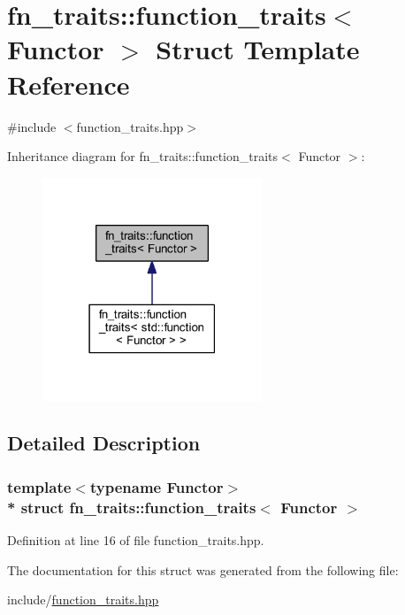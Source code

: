 \hypertarget{structfn__traits_1_1function__traits}{}\section{fn\+\_\+traits\+:\+:function\+\_\+traits$<$ Functor $>$ Struct Template Reference}
\label{structfn__traits_1_1function__traits}


{\ttfamily \#include $<$function\+\_\+traits.\+hpp$>$}



Inheritance diagram for fn\+\_\+traits\+:\+:function\+\_\+traits$<$ Functor $>$\+:\nopagebreak
\begin{figure}[H]
\begin{center}
\leavevmode
\includegraphics[width=186pt]{df/da7/structfn__traits_1_1function__traits__inherit__graph}
\end{center}
\end{figure}


\subsection{Detailed Description}
\subsubsection*{template$<$typename Functor$>$\\*
struct fn\+\_\+traits\+::function\+\_\+traits$<$ Functor $>$}



Definition at line 16 of file function\+\_\+traits.\+hpp.



The documentation for this struct was generated from the following file\+:\begin{DoxyCompactItemize}
\item 
include/\hyperlink{function__traits_8hpp}{function\+\_\+traits.\+hpp}\end{DoxyCompactItemize}
